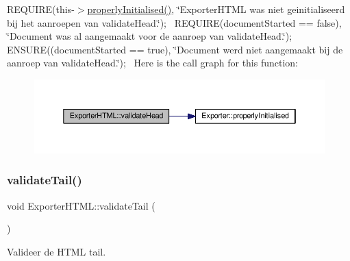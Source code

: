 R\+E\+Q\+U\+I\+RE(this-\/$>$\hyperlink{class_exporter_aafd9df9210aeefd7bb7fd434fc317cf0}{properly\+Initialised()}, \char`\"{}\+Exporter\+H\+T\+M\+L was niet geinitialiseerd bij het aanroepen van validate\+Head.\char`\"{});~\newline
R\+E\+Q\+U\+I\+RE(document\+Started == false), \char`\"{}\+Document was al aangemaakt voor de aanroep van validate\+Head.\char`\"{});~\newline
E\+N\+S\+U\+RE((document\+Started == true), \char`\"{}\+Document werd niet aangemaakt bij de aanroep van validate\+Head.\char`\"{});~\newline
Here is the call graph for this function\+:
\nopagebreak
\begin{figure}[H]
\begin{center}
\leavevmode
\includegraphics[width=350pt]{class_exporter_h_t_m_l_a2d9bb5e5f68a9e6111d8a929eb4a042e_cgraph}
\end{center}
\end{figure}
\mbox{\label{class_exporter_h_t_m_l_ab9d3ebcfa054f02f08ab34e1a6298963}} 
\subsubsection{\texorpdfstring{validate\+Tail()}{validateTail()}}
{\footnotesize\ttfamily void Exporter\+H\+T\+M\+L\+::validate\+Tail (\begin{DoxyParamCaption}{ }\end{DoxyParamCaption})}



Valideer de H\+T\+ML tail. 

